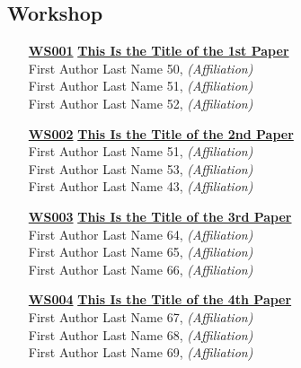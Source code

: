 \subsection{Workshop}
\begin{enumerate}
\item[\href{https://doi.org/10.1145/1122445.1122456}{\textbf{WS001}}]
\href{https://doi.org/10.1145/1122445.1122456}{\textbf{This Is the Title of the 1st Paper}}\\
First Author Last Name 50, \emph{(Affiliation)}\\
First Author Last Name 51, \emph{(Affiliation)}\\
First Author Last Name 52, \emph{(Affiliation)}\\

\item[\href{https://doi.org/10.1145/1122445.1122456}{\textbf{WS002}}]
\href{https://doi.org/10.1145/1122445.1122456}{\textbf{This Is the Title of the 2nd Paper}}\\
First Author Last Name 51, \emph{(Affiliation)}\\
First Author Last Name 53, \emph{(Affiliation)}\\
First Author Last Name 43, \emph{(Affiliation)}\\

\item[\href{https://doi.org/10.1145/1122445.1122456}{\textbf{WS003}}]
\href{https://doi.org/10.1145/1122445.1122456}{\textbf{This Is the Title of the 3rd Paper}}\\
First Author Last Name 64, \emph{(Affiliation)}\\
First Author Last Name 65, \emph{(Affiliation)}\\
First Author Last Name 66, \emph{(Affiliation)}\\

\item[\href{https://doi.org/10.1145/1122445.1122456}{\textbf{WS004}}]
\href{https://doi.org/10.1145/1122445.1122456}{\textbf{This Is the Title of the 4th Paper}}\\
First Author Last Name 67, \emph{(Affiliation)}\\
First Author Last Name 68, \emph{(Affiliation)}\\
First Author Last Name 69, \emph{(Affiliation)}\\
\end{enumerate}


